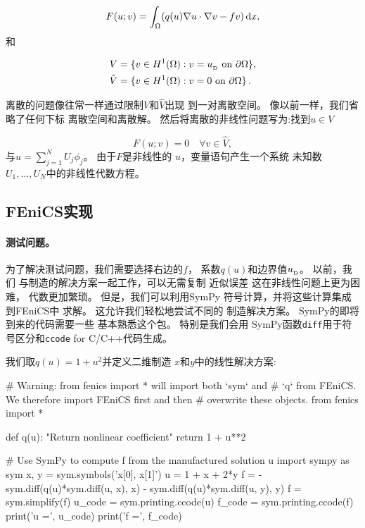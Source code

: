 \begin{equation}
F(u; v) = \int_\Omega (q(u)\nabla u\cdot \nabla v - fv) \, \mathrm{d}x,
\label{ch:poisson0:nonlinear2}
\end{equation}
和

\begin{align*}
     V      &= \{v \in H^1(\Omega) : v = u_{_\mathrm{D}} \mbox{ on } \partial\Omega\},\\
    \hat{V} &= \{v \in H^1(\Omega) : v = 0 \mbox{ on } \partial\Omega\}\thinspace .
\end{align*}

离散的问题像往常一样通过限制$V$和$\hat V$出现
到一对离散空间。 像以前一样，我们省略了任何下标
离散空间和离散解。
然后将离散的非线性问题写为:找到$u \in V$

\begin{equation}
  F(u; v) = 0 \quad \forall v \in \hat{V},
\label{ch:poisson0:nonlinear:d}
\end{equation}
与$u = \sum_{j=1}^N U_j \phi_j$。 由于$F$是非线性的
$u$，变量语句产生一个系统
未知数$U_1,\ldots,U_N$中的非线性代数方程。

\subsection{FEniCS实现}
\label{ftut:nonlinear:Newton:auto}

\paragraph{测试问题。}
为了解决测试问题，我们需要选择右边的$f$，
系数$q(u)$和边界值$u_{_\mathrm{D}}$。 以前，我们
与制造的解决方案一起工作，可以无需复制
近似误差 这在非线性问题上更为困难，
代数更加繁琐。 但是，我们可以利用SymPy
符号计算，并将这些计算集成到FEniCS中
求解。 这允许我们轻松地尝试不同的
制造解决方案。 SymPy的即将到来的代码需要一些
基本熟悉这个包。 特别是我们会用
SymPy函数\texttt{diff}用于符号区分和\texttt{ccode} for
C/C++代码生成。

我们取$q(u) = 1 + u^2$并定义二维制造
$x$和$y$中的线性解决方案:

\begin{python}
# Warning: from fenics import * will import both `sym` and
# `q` from FEniCS. We therefore import FEniCS first and then
# overwrite these objects.
from fenics import *

def q(u):
    "Return nonlinear coefficient"
    return 1 + u**2

# Use SymPy to compute f from the manufactured solution u
import sympy as sym
x, y = sym.symbols('x[0], x[1]')
u = 1 + x + 2*y
f = - sym.diff(q(u)*sym.diff(u, x), x) - sym.diff(q(u)*sym.diff(u, y), y)
f = sym.simplify(f)
u_code = sym.printing.ccode(u)
f_code = sym.printing.ccode(f)
print('u =', u_code)
print('f =', f_code)
\end{python}

